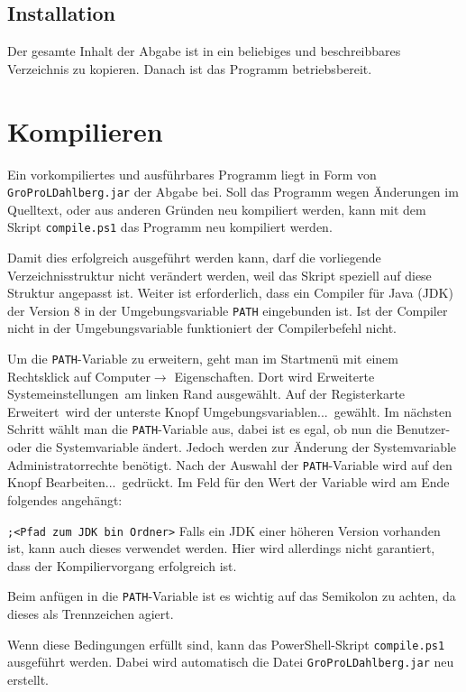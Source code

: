 \subsection{Installation}
Der gesamte Inhalt der Abgabe ist in ein beliebiges und beschreibbares Verzeichnis zu kopieren. Danach ist das Programm betriebsbereit.

\clearpage
\section{Kompilieren}
Ein vorkompiliertes und ausführbares Programm liegt in Form von \lstinline{GroProLDahlberg.jar} der Abgabe bei. Soll das Programm wegen Änderungen im Quelltext, oder aus anderen Gründen neu kompiliert werden, kann mit dem Skript \lstinline{compile.ps1} das Programm neu kompiliert werden.

Damit dies erfolgreich ausgeführt werden kann, darf die vorliegende Verzeichnisstruktur nicht verändert werden, weil das Skript speziell auf diese Struktur angepasst ist. Weiter ist erforderlich, dass ein Compiler für Java (JDK) der Version 8 in der Umgebungsvariable \lstinline{PATH} eingebunden ist. Ist der Compiler nicht in der Umgebungsvariable funktioniert der Compilerbefehl nicht.

Um die \lstinline{PATH}-Variable zu erweitern, geht man im Startmenü mit einem Rechtsklick auf \glqq Computer\grqq $\rightarrow$ \glqq Eigenschaften\grqq. Dort wird \glqq Erweiterte Systemeinstellungen\grqq\ am linken Rand ausgewählt. Auf der Registerkarte \glqq Erweitert\grqq\ wird der unterste Knopf \glqq Umgebungsvariablen...\grqq\ gewählt. Im nächsten Schritt wählt man die \lstinline{PATH}-Variable aus, dabei ist es egal, ob nun die Benutzer- oder die Systemvariable ändert. Jedoch werden zur Änderung der Systemvariable Administratorrechte benötigt. Nach der Auswahl der \lstinline{PATH}-Variable wird auf den Knopf \glqq Bearbeiten...\grqq\ gedrückt. Im Feld für den Wert der Variable wird am Ende folgendes angehängt:

\lstinline{;<Pfad zum JDK bin Ordner>}\newline
Falls ein JDK einer höheren Version vorhanden ist, kann auch dieses verwendet werden. Hier wird allerdings nicht garantiert, dass der Kompiliervorgang erfolgreich ist.

Beim anfügen in die \lstinline{PATH}-Variable ist es wichtig auf das Semikolon zu achten, da dieses als Trennzeichen agiert.

Wenn diese Bedingungen erfüllt sind, kann das PowerShell-Skript \lstinline{compile.ps1} ausgeführt werden. Dabei wird automatisch die Datei \lstinline{GroProLDahlberg.jar} neu erstellt.

